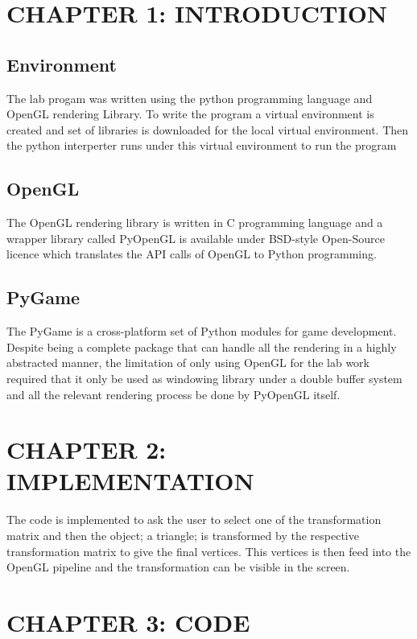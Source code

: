 \documentclass[12pt]{article}
\begin{document}
\clearpage
\thispagestyle{empty}
\tableofcontents

\clearpage
\thispagestyle{empty}
\listoffigures

\clearpage
{}
\section{CHAPTER 1: INTRODUCTION}

\subsection{Environment}
The lab progam was written using the python programming language and OpenGL rendering Library. To write the program a virtual environment is
created and set of libraries is downloaded for the local virtual environment. Then the python interperter runs under this virtual environment
to run the program

\subsection{OpenGL}
The OpenGL rendering library is written in C programming language and a wrapper library called PyOpenGL is available under BSD-style Open-Source licence which translates the
API calls of OpenGL to Python programming.

\subsection{PyGame}
The PyGame is a cross-platform set of Python modules for game development. Despite being a complete package that can handle all the rendering in a highly abstracted manner, the
limitation of only using OpenGL for the lab work required that it only be used as windowing library under a double buffer system and all the relevant rendering process be done by PyOpenGL itself.

\section{CHAPTER 2: IMPLEMENTATION}
The code is implemented to ask the user to select one of the transformation matrix and then the object; a triangle; is transformed by the respective transformation matrix to give the
final vertices. This vertices is then feed into the OpenGL pipeline and the transformation can be visible in the screen.

\clearpage
\section{CHAPTER 3: CODE}
\end{document}
